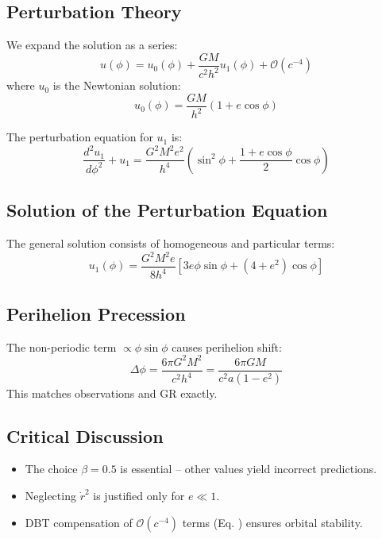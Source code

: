 \subsection{Perturbation Theory}
We expand the solution as a series:
\begin{equation}
u(\phi) = u_0(\phi) + \frac{GM}{c^2h^2}u_1(\phi) + \mathcal{O}(c^{-4})
\end{equation}
where $u_0$ is the Newtonian solution:
\begin{equation}
u_0(\phi) = \frac{GM}{h^2}(1 + e\cos\phi)
\end{equation}

The perturbation equation for $u_1$ is:
\begin{equation}
\frac{d^2u_1}{d\phi^2} + u_1 = \frac{G^2M^2e^2}{h^4}\left(\sin^2\phi + \frac{1 + e\cos\phi}{2}\cos\phi\right)
\end{equation}

\subsection{Solution of the Perturbation Equation}
The general solution consists of homogeneous and particular terms:
\begin{equation}
u_1(\phi) = \frac{G^2M^2e}{8h^4}\left[3e\phi\sin\phi + (4 + e^2)\cos\phi\right]
\end{equation}

\subsection{Perihelion Precession}
The non-periodic term $\propto \phi\sin\phi$ causes perihelion shift:
\begin{equation}
\Delta\phi = \frac{6\pi G^2M^2}{c^2h^4} = \frac{6\pi GM}{c^2a(1 - e^2)}
\end{equation}
This matches observations and GR exactly.

\subsection{Critical Discussion}
\begin{itemize}
\item The choice $\beta = 0.5$ is essential – other values yield incorrect predictions.
\item Neglecting $\dot{r}^2$ is justified only for $e \ll 1$.
\item DBT compensation of $\mathcal{O}(c^{-4})$ terms (Eq. ) ensures orbital stability.
\end{itemize}

